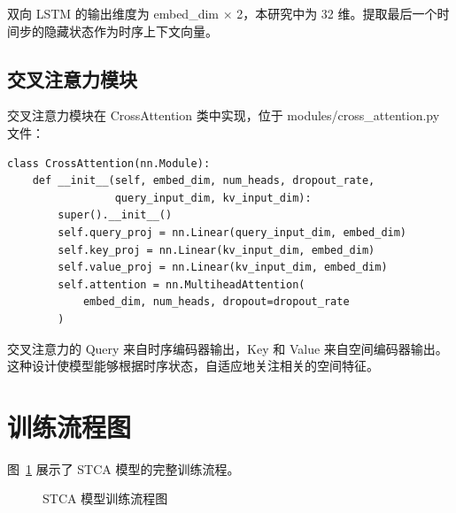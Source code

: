 双向 LSTM 的输出维度为 embed\_dim $\times$ 2，本研究中为 32 维。提取最后一个时间步的隐藏状态作为时序上下文向量。

\subsection{交叉注意力模块}

交叉注意力模块在 CrossAttention 类中实现，位于 modules/cross\_attention.py 文件：

\begin{verbatim}
class CrossAttention(nn.Module):
    def __init__(self, embed_dim, num_heads, dropout_rate,
                 query_input_dim, kv_input_dim):
        super().__init__()
        self.query_proj = nn.Linear(query_input_dim, embed_dim)
        self.key_proj = nn.Linear(kv_input_dim, embed_dim)
        self.value_proj = nn.Linear(kv_input_dim, embed_dim)
        self.attention = nn.MultiheadAttention(
            embed_dim, num_heads, dropout=dropout_rate
        )
\end{verbatim}

交叉注意力的 Query 来自时序编码器输出，Key 和 Value 来自空间编码器输出。这种设计使模型能够根据时序状态，自适应地关注相关的空间特征。

\section{训练流程图}

图~\ref{fig:training-flowchart} 展示了 STCA 模型的完整训练流程。

\begin{figure}[h]
\centering
{}
\caption{STCA 模型训练流程图}
\label{fig:training-flowchart}
\end{figure}

